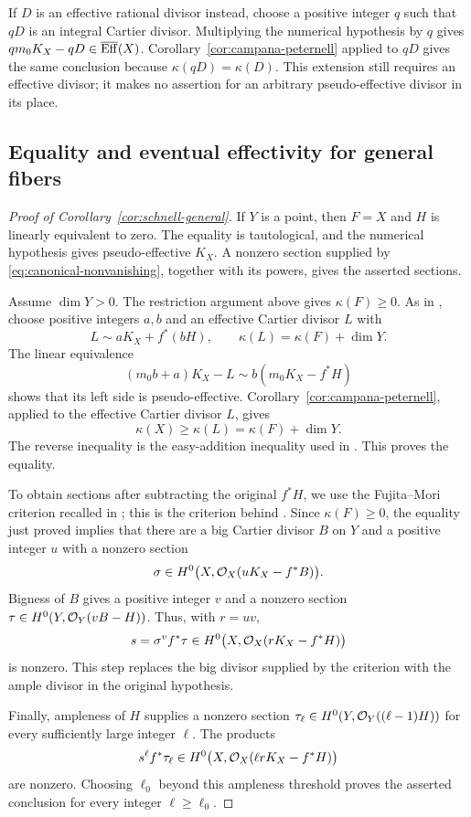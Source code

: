 If $D$ is an effective rational divisor instead, choose a positive
integer $q$ such that $qD$ is an integral Cartier divisor.
Multiplying the numerical hypothesis by $q$ gives
$qm_0K_X-qD\in\overline{\operatorname{Eff}}(X)$. Corollary~\ref{cor:campana-peternell}
applied to $qD$ gives the same conclusion because
$\kappa(qD)=\kappa(D)$. This extension still requires an effective
divisor; it makes no assertion for an arbitrary pseudo-effective
divisor in its place.

\subsection{Equality and eventual effectivity for general fibers}

\begin{proof}[Proof of Corollary~\ref{cor:schnell-general}]
If $Y$ is a point, then $F=X$ and $H$ is linearly equivalent to zero.
The equality is tautological, and the numerical hypothesis gives
pseudo-effective $K_X$. A nonzero section supplied by
\eqref{eq:canonical-nonvanishing}, together with its powers, gives
the asserted sections.

Assume $\dim Y>0$. The restriction argument above gives
$\kappa(F)\geq0$. As in \cite[Lemma~7.1]{Schnell2022}, choose
positive integers $a,b$ and an effective Cartier divisor $L$ with
\[
 L\sim aK_X+f^*(bH),\qquad \kappa(L)=\kappa(F)+\dim Y.
\]
The linear equivalence
\[
 (m_0b+a)K_X-L\sim b(m_0K_X-f^*H)
\]
shows that its left side is pseudo-effective.
Corollary~\ref{cor:campana-peternell}, applied to the effective
Cartier divisor $L$, gives
\[
 \kappa(X)\geq\kappa(L)=\kappa(F)+\dim Y.
\]
The reverse inequality is the easy-addition inequality used in
\cite[Lemma~7.1]{Schnell2022}. This proves the equality.

To obtain sections after subtracting the original $f^*H$, we use
the Fujita--Mori criterion recalled in
\cite[Lemma~4.6]{PopaSchnell2014}; this is the criterion behind
\cite[Section~8]{Schnell2022}. Since $\kappa(F)\geq0$, the equality
just proved implies that there are a big Cartier divisor $B$ on $Y$
and a positive integer $u$ with a nonzero section
\[
 \sigma\in H^0\bigl(X,\mathcal O_X(uK_X-f^*B)\bigr).
\]
Bigness of $B$ gives a positive integer $v$ and a nonzero section
$\tau\in H^0(Y,\mathcal O_Y(vB-H))$. Thus, with $r=uv$,
\[
 s=\sigma^v f^*\tau
 \in H^0\bigl(X,\mathcal O_X(rK_X-f^*H)\bigr)
\]
is nonzero. This step replaces the big divisor supplied by the
criterion with the ample divisor in the original hypothesis.

Finally, ampleness of $H$ supplies a nonzero section
$\tau_\ell\in H^0(Y,\mathcal O_Y((\ell-1)H))$ for every sufficiently
large integer $\ell$. The products
\[
 s^\ell f^*\tau_\ell
 \in H^0\bigl(X,\mathcal O_X(\ell rK_X-f^*H)\bigr)
\]
are nonzero. Choosing $\ell_0$ beyond this ampleness threshold proves
the asserted conclusion for every integer $\ell\geq\ell_0$.
\end{proof}
